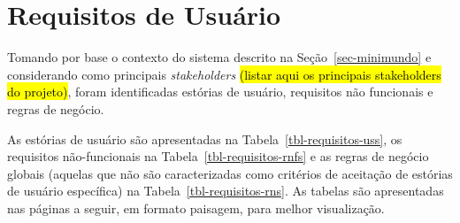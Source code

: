 \chapter{Requisitos de Usuário}
\label{sec-requisitos}



Tomando por base o contexto do sistema descrito na Seção~\ref{sec-minimundo} e considerando como principais \textit{stakeholders} \hl{(listar aqui os principais stakeholders do projeto)}, foram identificadas estórias de usuário, requisitos não funcionais e regras de negócio.

As estórias de usuário são apresentadas na Tabela~\ref{tbl-requisitos-uss}, os requisitos não-funcionais na Tabela~\ref{tbl-requisitos-rnfs} e as regras de negócio globais (aquelas que não são caracterizadas como critérios de aceitação de estórias de usuário específica) na Tabela~\ref{tbl-requisitos-rns}. As tabelas são apresentadas nas páginas a seguir, em formato paisagem, para melhor visualização.

